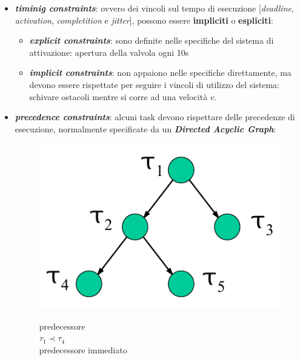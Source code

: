 \begin{itemize}
    \item \textbf{\textit{timinig constraints}}: ovvero dei vincoli sul tempo di esecuzione [\textit{deadline}, \textit{activation}, \textit{completition} e \textit{jitter}], possono essere \textbf{impliciti} o \textbf{espliciti}:
    \begin{itemize}
        \item \textbf{\textit{explicit constraints}}: sono definite nelle specifiche del sistema di attivazione: apertura della valvola ogni 10s
        \item \textbf{\textit{implicit constraints}}: non appaiono nelle specifiche direttamente, ma devono essere rispettate per seguire i vincoli di utilizzo del sistema: schivare ostacoli mentre si corre ad una velocità $v$.
    \end{itemize}
    \item \textbf{\textit{precedence constraints}}: alcuni task devono rispettare delle precedenze di esecuzione, normalmente specificate da un \textbf{\textit{Directed Acyclic Graph}}:
    \begin{figure}[h]
        \centering
        \begin{minipage}[t]{0.45\textwidth}
            \centering
            \includegraphics[width=\textwidth]{img/dag}
        \end{minipage}
        \begin{minipage}[t]{0.45\textwidth}
            \begin{center}
                predecessore \\
                $\tau_1 \prec \tau_4$ \\
                predecessore immediato \\

\end{center}
\end{minipage}
\end{figure}
\end{itemize}
